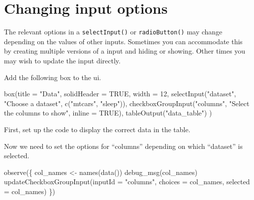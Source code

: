 \documentclass[
]{book}
\newenvironment{Shaded}{\begin{snugshade}}{\end{snugshade}}
\newcommand{\AttributeTok}[1]{\textcolor[rgb]{0.77,0.63,0.00}{#1}}
\newcommand{\ConstantTok}[1]{\textcolor[rgb]{0.00,0.00,0.00}{#1}}
\newcommand{\DecValTok}[1]{\textcolor[rgb]{0.00,0.00,0.81}{#1}}
\newcommand{\FunctionTok}[1]{\textcolor[rgb]{0.00,0.00,0.00}{#1}}
\newcommand{\NormalTok}[1]{#1}
\newcommand{\OtherTok}[1]{\textcolor[rgb]{0.56,0.35,0.01}{#1}}
\newcommand{\SpecialCharTok}[1]{\textcolor[rgb]{0.00,0.00,0.00}{#1}}
\newcommand{\StringTok}[1]{\textcolor[rgb]{0.31,0.60,0.02}{#1}}
\begin{document}
\hypertarget{changing-input-options}{%
\section{Changing input options}\label{changing-input-options}}

The relevant options in a \texttt{selectInput()} or \texttt{radioButton()} may change depending on the values of other inputs. Sometimes you can accommodate this by creating multiple versions of a input and hiding or showing. Other times you may wish to update the input directly.

Add the following box to the ui.

\begin{Shaded}
\begin{Highlighting}[]
\FunctionTok{box}\NormalTok{(}\AttributeTok{title =} \StringTok{"Data"}\NormalTok{, }\AttributeTok{solidHeader =} \ConstantTok{TRUE}\NormalTok{, }\AttributeTok{width =} \DecValTok{12}\NormalTok{,}
  \FunctionTok{selectInput}\NormalTok{(}\StringTok{"dataset"}\NormalTok{, }\StringTok{"Choose a dataset"}\NormalTok{, }\FunctionTok{c}\NormalTok{(}\StringTok{"mtcars"}\NormalTok{, }\StringTok{"sleep"}\NormalTok{)),}
  \FunctionTok{checkboxGroupInput}\NormalTok{(}\StringTok{"columns"}\NormalTok{, }\StringTok{"Select the columns to show"}\NormalTok{, }\AttributeTok{inline =} \ConstantTok{TRUE}\NormalTok{),}
  \FunctionTok{tableOutput}\NormalTok{(}\StringTok{"data\_table"}\NormalTok{)}
\NormalTok{)}
\end{Highlighting}
\end{Shaded}

First, set up the code to display the correct data in the table.

\begin{Shaded}
\end{Shaded}

Now we need to set the options for ``columns'' depending on which ``dataset'' is selected.

\begin{Shaded}
\begin{Highlighting}[]
\FunctionTok{observe}\NormalTok{(\{}
\NormalTok{  col\_names }\OtherTok{\textless{}{-}} \FunctionTok{names}\NormalTok{(}\FunctionTok{data}\NormalTok{())}
  \FunctionTok{debug\_msg}\NormalTok{(col\_names)}
  \FunctionTok{updateCheckboxGroupInput}\NormalTok{(}\AttributeTok{inputId =} \StringTok{"columns"}\NormalTok{,}
                           \AttributeTok{choices =}\NormalTok{ col\_names,}
                           \AttributeTok{selected =}\NormalTok{ col\_names)}
\NormalTok{\})}
\end{Highlighting}
\end{Shaded}
\end{document}
